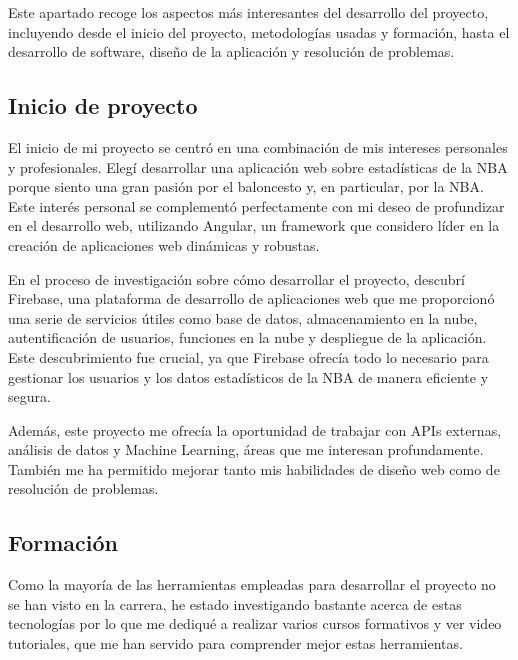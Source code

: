 
Este apartado recoge los aspectos más interesantes del desarrollo del proyecto, incluyendo desde el inicio del proyecto, metodologías usadas y formación, hasta el desarrollo de software, diseño de la aplicación y resolución de problemas.


\subsection{Inicio de proyecto}
El inicio de mi proyecto se centró en una combinación de mis intereses personales y profesionales. Elegí desarrollar una aplicación web sobre estadísticas de la NBA porque siento una gran pasión por el baloncesto y, en particular, por la NBA. Este interés personal se complementó perfectamente con mi deseo de profundizar en el desarrollo web, utilizando Angular, un framework que considero líder en la creación de aplicaciones web dinámicas y robustas.

En el proceso de investigación sobre cómo desarrollar el proyecto, descubrí Firebase, una plataforma de desarrollo de aplicaciones web que me proporcionó una serie de servicios útiles como base de datos, almacenamiento en la nube, autentificación de usuarios, funciones en la nube y despliegue de la aplicación. Este descubrimiento fue crucial, ya que Firebase ofrecía todo lo necesario para gestionar los usuarios y los datos estadísticos de la NBA de manera eficiente y segura.

Además, este proyecto me ofrecía la oportunidad de trabajar con APIs externas, análisis de datos y Machine Learning, áreas que me interesan profundamente. También me ha permitido mejorar tanto mis habilidades de diseño web como de resolución de problemas.


\subsection{Formación}
Como la mayoría de las herramientas empleadas para desarrollar el proyecto no se han visto en la carrera, he estado investigando bastante acerca de estas tecnologías por lo que me dediqué a realizar varios cursos formativos y ver video tutoriales, que me han servido para comprender mejor estas herramientas.

